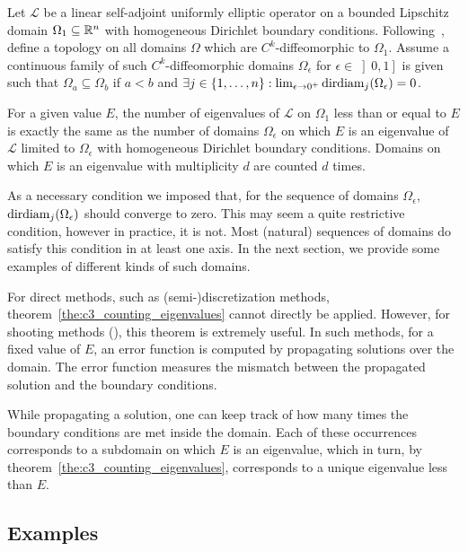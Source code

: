 \begin{theorem}\label{the:c3_counting_eigenvalues}
  Let $\mathcal{L}$ be a linear self-adjoint uniformly elliptic operator on a bounded Lipschitz domain $\Omega_1 \subseteq \mathbb{R}^n$ with homogeneous Dirichlet boundary conditions. Following~\cite{hale_eigenvalues_2005}, define a topology on all domains $\Omega$ which are $C^k$-diffeomorphic to $\Omega_1$.  Assume a continuous family of such $C^k$-diffeomorphic domains $\Omega_\epsilon$ for $\epsilon\in\left]0, 1\right]$ is given such that $\Omega_a \subseteq \Omega_b$ if $a < b$ and $\exists j\in\{1, \dots, n\} : \lim_{\epsilon\to 0^+} \operatorname{dirdiam}_j(\Omega_\epsilon) = 0$.

  For a given value $E$, the number of eigenvalues of $\mathcal{L}$ on $\Omega_1$ less than or equal to $E$ is exactly the same as the number of domains $\Omega_\epsilon$ on which $E$ is an eigenvalue of $\mathcal{L}$ limited to $\Omega_\epsilon$ with homogeneous Dirichlet boundary conditions. Domains on which $E$ is an eigenvalue with multiplicity $d$ are counted $d$ times.
\end{theorem}

As a necessary condition we imposed that, for the sequence of domains $\Omega_\epsilon$, $\operatorname{dirdiam}_j(\Omega_\epsilon)$ should converge to zero. This may seem a quite restrictive condition, however in practice, it is not. Most (natural) sequences of domains do satisfy this condition in at least one axis. In the next section, we provide some examples of different kinds of such domains.

For direct methods, such as (semi-)discretization methods, theorem~\ref{the:c3_counting_eigenvalues} cannot directly be applied. However, for shooting methods (\cite{ixaru_new_2010,baeyens_improvements_2022}), this theorem is extremely useful. In such methods, for a fixed value of $E$, an error function is computed by propagating solutions over the domain. The error function measures the mismatch between the propagated solution and the boundary conditions.

While propagating a solution, one can keep track of how many times the boundary conditions are met inside the domain. Each of these occurrences corresponds to a subdomain on which $E$ is an eigenvalue, which in turn, by theorem~\ref{the:c3_counting_eigenvalues}, corresponds to a unique eigenvalue less than $E$.


\subsection{Examples}\label{sec:c3_counting_examples}

